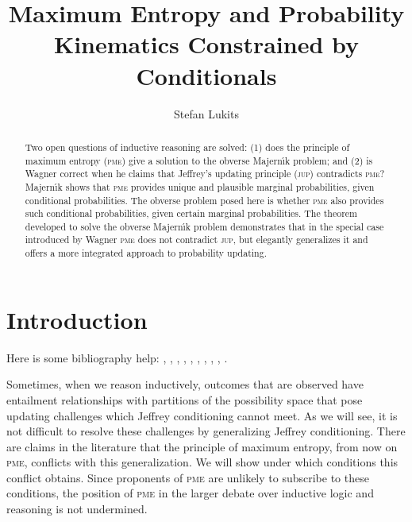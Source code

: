 \documentclass[11pt]{article}
\begin{document}


\title{Maximum Entropy and Probability Kinematics Constrained by Conditionals}
\author{Stefan Lukits}
\date{}
\maketitle


\begin{abstract} 
  {\noindent}Two open questions of inductive reasoning are solved: (1)
  does the principle of maximum entropy (\textsc{pme}) give a solution
  to the obverse Majern{\'\i}k problem; and (2) is Wagner correct when
  he claims that Jeffrey's updating principle (\textsc{jup}) contradicts
  \textsc{pme}?  Majern{\'\i}k shows that \textsc{pme}
  provides unique and plausible marginal probabilities, given
  conditional probabilities.  The obverse problem posed here is
  whether \textsc{pme} also provides such conditional
  probabilities, given certain marginal probabilities. The theorem
  developed to solve the obverse Majern{\'\i}k problem demonstrates
  that in the special case introduced by Wagner \textsc{pme} does
  not contradict \textsc{jup}, but elegantly generalizes it and offers
  a more integrated approach to probability updating.
\end{abstract}

\section{Introduction}
\label{Introduction}

Here is some bibliography help: ,
, ,
, ,
, ,
, ,
.

Sometimes, when we reason inductively, outcomes that are observed have
entailment relationships with partitions of the possibility space that
pose updating challenges which Jeffrey conditioning cannot meet. As we
will see, it is not difficult to resolve these challenges by
generalizing Jeffrey conditioning. There are claims in the literature
that the principle of maximum entropy, from now on \textsc{pme},
conflicts with this generalization. We will show under which
conditions this conflict obtains. Since proponents of
\textsc{pme} are unlikely to subscribe to these conditions, the
position of \textsc{pme} in the larger debate over inductive logic
and reasoning is not undermined.
\end{document}
